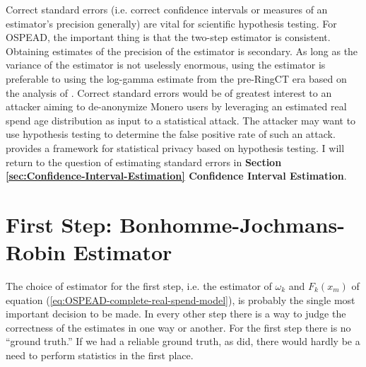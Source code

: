 \documentclass[english]{article}
\begin{document}
Correct standard errors (i.e. correct confidence intervals or measures
of an estimator's precision generally) are vital for scientific hypothesis
testing. For OSPEAD, the important thing is that the two-step estimator
is consistent. Obtaining estimates of the precision of the estimator
is secondary. As long as the variance of the estimator is not uselessly
enormous, using the estimator is preferable to using the log-gamma
estimate from the pre-RingCT era based on the analysis of \cite{2018}.
Correct standard errors would be of greatest interest to an attacker
aiming to de-anonymize Monero users by leveraging an estimated real
spend age distribution as input to a statistical attack. The attacker
may want to use hypothesis testing to determine the false positive
rate of such an attack. \cite{Liu_2019} provides a framework for
statistical privacy based on hypothesis testing. I will return to
the question of estimating standard errors in \textbf{Section \ref{sec:Confidence-Interval-Estimation}
Confidence Interval Estimation}.

\section{First Step: Bonhomme-Jochmans-Robin Estimator\label{sec:First-Step-Bonhomme-Jochmans-Robin-Estimator}}

The choice of estimator for the first step, i.e. the estimator of
$\omega_{k}$ and $F_{k}(x_{m})$ of equation (\ref{eq:OSPEAD-complete-real-spend-model}),
is probably the single most important decision to be made. In every
other step there is a way to judge the correctness of the estimates
in one way or another. For the first step there is no ``ground truth.''
If we had a reliable ground truth, as \cite{2018} did, there would
hardly be a need to perform statistics in the first place.
\end{document}
